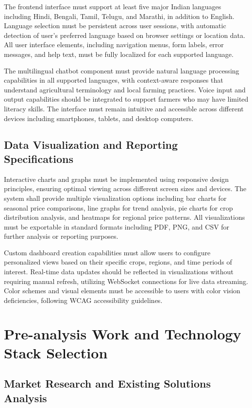 The frontend interface must support at least five major Indian languages including Hindi, Bengali, Tamil, Telugu, and Marathi, in addition to English. Language selection must be persistent across user sessions, with automatic detection of user's preferred language based on browser settings or location data. All user interface elements, including navigation menus, form labels, error messages, and help text, must be fully localized for each supported language.

The multilingual chatbot component must provide natural language processing capabilities in all supported languages, with context-aware responses that understand agricultural terminology and local farming practices. Voice input and output capabilities should be integrated to support farmers who may have limited literacy skills. The interface must remain intuitive and accessible across different devices including smartphones, tablets, and desktop computers.

\subsection{Data Visualization and Reporting Specifications}

Interactive charts and graphs must be implemented using responsive design principles, ensuring optimal viewing across different screen sizes and devices. The system shall provide multiple visualization options including bar charts for seasonal price comparisons, line graphs for trend analysis, pie charts for crop distribution analysis, and heatmaps for regional price patterns. All visualizations must be exportable in standard formats including PDF, PNG, and CSV for further analysis or reporting purposes.

Custom dashboard creation capabilities must allow users to configure personalized views based on their specific crops, regions, and time periods of interest. Real-time data updates should be reflected in visualizations without requiring manual refresh, utilizing WebSocket connections for live data streaming. Color schemes and visual elements must be accessible to users with color vision deficiencies, following WCAG accessibility guidelines.

\section{Pre-analysis Work and Technology Stack Selection}

\subsection{Market Research and Existing Solutions Analysis}

